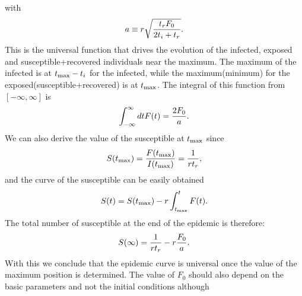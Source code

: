 \documentclass[a4paper,oneside,11pt]{article}
\begin{document}
with 
\begin{eqnarray}
a\equiv r \sqrt{{t_r F_0\over 2 t_i+t_r}}.
\end{eqnarray}
This is the universal function that drives the evolution of the infected, exposed and susceptible+recovered individuals near the maximum. The maximum of the infected is at $t_{\rm max}-t_i$ for the infected, while the maximum(minimum) for the exposed(susceptible+recovered) is at $t_{\rm max}$. The integral of this function from $[-\infty, \infty]$ is
\begin{eqnarray}
\int_{-\infty}^{\infty} dt F(t) = {2 F_0 \over a}.
\end{eqnarray}
We can also derive the value of the susceptible at $t_{\rm max}$ since
\begin{eqnarray}
S(t_{\rm max}) = {F(t_{\rm max}) \over I(t_{\rm max})} = {1  \over r t_r},
\end{eqnarray}
and the curve of the susceptible can be easily obtained 
\begin{eqnarray}
S(t) = S(t_{\rm max}) - r \int_{t_{\rm max}}^t F(t).
\end{eqnarray}
The total number of susceptible at the end of the epidemic is therefore:
\begin{eqnarray}
S(\infty) = {1\over r t_r } - r {F_0\over a}.
\end{eqnarray}
With this we conclude that the epidemic curve is universal once the value of the maximum position is determined. The value of $F_0$ should also 
depend on the basic parameters and not the initial conditions although 
\end{document}
